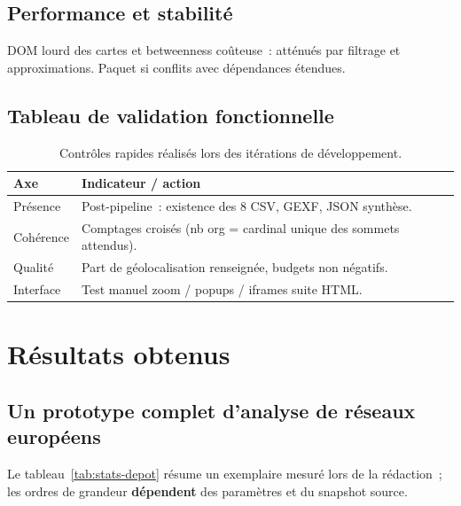 \documentclass[12pt,a4paper,oneside]{article}
\begin{document}
\subsection{Performance et stabilité}
DOM lourd des cartes et betweenness coûteuse~: atténués par filtrage et approximations. Paquet  si conflits avec dépendances étendues.

\subsection{Tableau de validation fonctionnelle}
\begin{table}[htbp]
\centering
\small
\caption{Contrôles rapides réalisés lors des itérations de développement.}
\label{tab:checks}
\begin{tabularx}{\textwidth}{@{}l X@{}}
\toprule
\textbf{Axe} & \textbf{Indicateur / action} \\
\midrule
Présence & Post-pipeline~: existence des 8 CSV, GEXF, JSON synthèse. \\
Cohérence & Comptages croisés (nb org = cardinal unique des sommets attendus). \\
Qualité & Part de géolocalisation renseignée, budgets non négatifs. \\
Interface & Test manuel zoom / popups / iframes suite HTML. \\
\bottomrule
\end{tabularx}
\end{table}


\section{Résultats obtenus}

\subsection{Un prototype complet d'analyse de réseaux européens}
Le tableau~\ref{tab:stats-depot} résume un exemplaire mesuré lors de la rédaction~; les ordres de grandeur \textbf{dépendent} des paramètres et du snapshot source.
\end{document}
